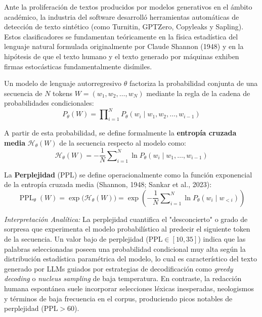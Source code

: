 Ante la proliferación de textos producidos por modelos generativos en el ámbito académico, la industria del software desarrolló herramientas automáticas de detección de texto sintético (como Turnitin, GPTZero, Copyleaks y Sapling). Estos clasificadores se fundamentan teóricamente en la física estadística del lenguaje natural formulada originalmente por Claude Shannon (1948) y en la hipótesis de que el texto humano y el texto generado por máquinas exhiben firmas estocásticas fundamentalmente disímiles.

Un modelo de lenguaje autorregresivo $\theta$ factoriza la probabilidad conjunta de una secuencia de $N$ tokens $W = (w_1, w_2, \dots, w_N)$ mediante la regla de la cadena de probabilidades condicionales:
\begin{equation}
P_\theta(W) = \prod\nolimits_{i=1}^N P_\theta(w_i \mid w_1, w_2, \dots, w_{i-1})
\end{equation}

A partir de esta probabilidad, se define formalmente la \textbf{entropía cruzada media} $\mathcal{H}_\theta(W)$ de la secuencia respecto al modelo como:
\begin{equation}
\mathcal{H}_\theta(W) = -\frac{1}{N} \sum\nolimits_{i=1}^N \ln P_\theta(w_i \mid w_1, \dots, w_{i-1})
\end{equation}

La \textbf{Perplejidad} ($\text{PPL}$) se define operacionalmente como la función exponencial de la entropía cruzada media (Shannon, 1948; Sankar et al., 2023):
\begin{equation}
\operatorname{PPL}_\theta(W) = \exp\bigl( \mathcal{H}_\theta(W) \bigr) = \exp\left( -\frac{1}{N} \sum\nolimits_{i=1}^N \ln P_\theta(w_i \mid w_{<i}) \right)
\end{equation}

\textit{Interpretación Analítica:} La perplejidad cuantifica el "desconcierto" o grado de sorpresa que experimenta el modelo probabilístico al predecir el siguiente token de la secuencia. Un valor bajo de perplejidad ($\text{PPL} \in [10, 35]$) indica que las palabras seleccionadas poseen una probabilidad condicional muy alta según la distribución estadística paramétrica del modelo, lo cual es característico del texto generado por LLMs guiados por estrategias de decodificación como \textit{greedy decoding} o \textit{nucleus sampling} de baja temperatura. En contraste, la redacción humana espontánea suele incorporar selecciones léxicas inesperadas, neologismos y términos de baja frecuencia en el corpus, produciendo picos notables de perplejidad ($\text{PPL} > 60$).

